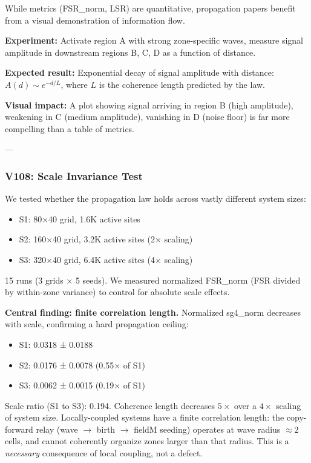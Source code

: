 \documentclass[11pt]{article}
\begin{document}
While metrics (FSR\_norm, LSR) are quantitative, propagation papers benefit from a visual demonstration of information flow.

\textbf{Experiment:} Activate region A with strong zone-specific waves, measure signal amplitude in downstream regions B, C, D as a function of distance.

\textbf{Expected result:} Exponential decay of signal amplitude with distance: $A(d) \sim e^{-d/L}$, where $L$ is the coherence length predicted by the law.

\textbf{Visual impact:} A plot showing signal arriving in region B (high amplitude), weakening in C (medium amplitude), vanishing in D (noise floor) is far more compelling than a table of metrics.

---

\subsubsection{V108: Scale Invariance Test}

We tested whether the propagation law holds across vastly different system sizes:
\begin{itemize}
  \item S1: 80×40 grid, 1.6K active sites
  \item S2: 160×40 grid, 3.2K active sites (2× scaling)
  \item S3: 320×40 grid, 6.4K active sites (4× scaling)
\end{itemize}

15 runs (3 grids × 5 seeds). We measured normalized FSR\_norm (FSR divided by within-zone variance) to control for absolute scale effects.

\textbf{Central finding: finite correlation length.} Normalized sg4\_norm decreases with scale, confirming a hard propagation ceiling:
\begin{itemize}
  \item S1: 0.0318 ± 0.0188
  \item S2: 0.0176 ± 0.0078 (0.55× of S1)
  \item S3: 0.0062 ± 0.0015 (0.19× of S1)
\end{itemize}

Scale ratio (S1 to S3): 0.194. Coherence length decreases $5\times$ over a $4\times$ scaling of system size. Locally-coupled systems have a finite correlation length: the copy-forward relay (wave $\to$ birth $\to$ fieldM seeding) operates at wave radius $\approx 2$ cells, and cannot coherently organize zones larger than that radius. This is a \emph{necessary} consequence of local coupling, not a defect.
\end{document}
